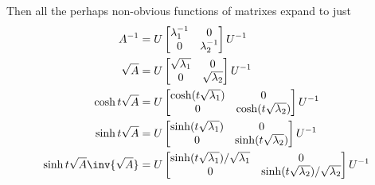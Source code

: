 Then all the perhaps non-obvious functions of matrixes expand to just
\begin{subequations}
\label{eqn:hoopSpring:13}
\begin{align}
A^{-1} &= U 
\begin{bmatrix}
\lambda_1^{-1} & 0 \\
0 & \lambda_2^{-1} 
\end{bmatrix}
U^{-1} \\
\sqrt{A} &= U 
\begin{bmatrix}
\sqrt{\lambda_1} & 0 \\
0 & \sqrt{\lambda_2}
\end{bmatrix}
U^{-1} \\
\cosh{t \sqrt{A}} &= U 
\begin{bmatrix}
\cosh( t \sqrt{\lambda_1} ) & 0 \\
0 & \cosh( t \sqrt{\lambda_2} )
\end{bmatrix}
U^{-1} \\
\sinh{t \sqrt{A}} &= U 
\begin{bmatrix}
\sinh( t \sqrt{\lambda_1} ) & 0 \\
0 & \sinh( t \sqrt{\lambda_2} )
\end{bmatrix}
U^{-1} \\
\sinh{t \sqrt{A}} \inv{\sqrt{A}} &= U 
\begin{bmatrix}
\sinh( t \sqrt{\lambda_1} )/\sqrt{\lambda_1} & 0 \\
0 & \sinh( t \sqrt{\lambda_2} )/\sqrt{\lambda_2}
\end{bmatrix}
U^{-1} 
\end{align}
\end{subequations}

\EndNoBibArticle

